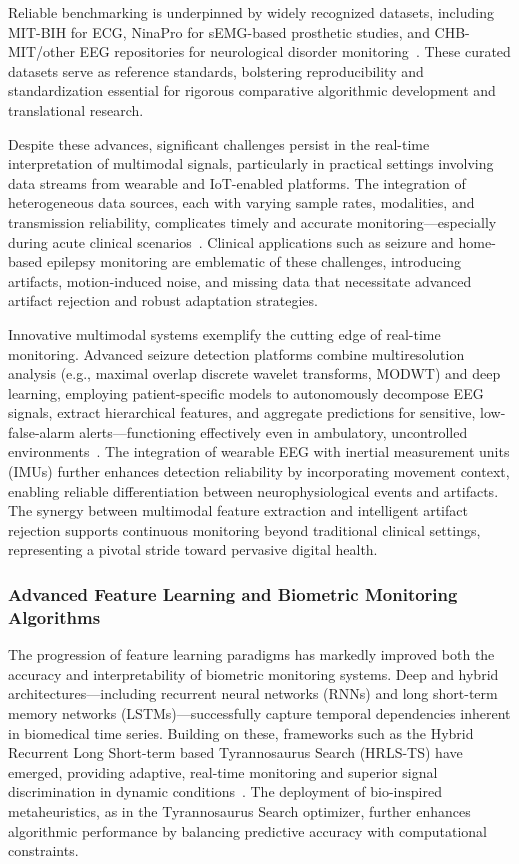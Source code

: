 Reliable benchmarking is underpinned by widely recognized datasets, including MIT-BIH for ECG, NinaPro for sEMG-based prosthetic studies, and CHB-MIT/other EEG repositories for neurological disorder monitoring~\cite{ref96,ref97,ref101}. These curated datasets serve as reference standards, bolstering reproducibility and standardization essential for rigorous comparative algorithmic development and translational research.

Despite these advances, significant challenges persist in the real-time interpretation of multimodal signals, particularly in practical settings involving data streams from wearable and IoT-enabled platforms. The integration of heterogeneous data sources, each with varying sample rates, modalities, and transmission reliability, complicates timely and accurate monitoring—especially during acute clinical scenarios~\cite{ref98,ref102,ref106,ref107}. Clinical applications such as seizure and home-based epilepsy monitoring are emblematic of these challenges, introducing artifacts, motion-induced noise, and missing data that necessitate advanced artifact rejection and robust adaptation strategies.

Innovative multimodal systems exemplify the cutting edge of real-time monitoring. Advanced seizure detection platforms combine multiresolution analysis (e.g., maximal overlap discrete wavelet transforms, MODWT) and deep learning, employing patient-specific models to autonomously decompose EEG signals, extract hierarchical features, and aggregate predictions for sensitive, low-false-alarm alerts—functioning effectively even in ambulatory, uncontrolled environments~\cite{ref98,ref102,ref103}. The integration of wearable EEG with inertial measurement units (IMUs) further enhances detection reliability by incorporating movement context, enabling reliable differentiation between neurophysiological events and artifacts. The synergy between multimodal feature extraction and intelligent artifact rejection supports continuous monitoring beyond traditional clinical settings, representing a pivotal stride toward pervasive digital health.

\subsubsection{Advanced Feature Learning and Biometric Monitoring Algorithms}

The progression of feature learning paradigms has markedly improved both the accuracy and interpretability of biometric monitoring systems. Deep and hybrid architectures—including recurrent neural networks (RNNs) and long short-term memory networks (LSTMs)—successfully capture temporal dependencies inherent in biomedical time series. Building on these, frameworks such as the Hybrid Recurrent Long Short-term based Tyrannosaurus Search (HRLS-TS) have emerged, providing adaptive, real-time monitoring and superior signal discrimination in dynamic conditions~\cite{ref107}. The deployment of bio-inspired metaheuristics, as in the Tyrannosaurus Search optimizer, further enhances algorithmic performance by balancing predictive accuracy with computational constraints.

